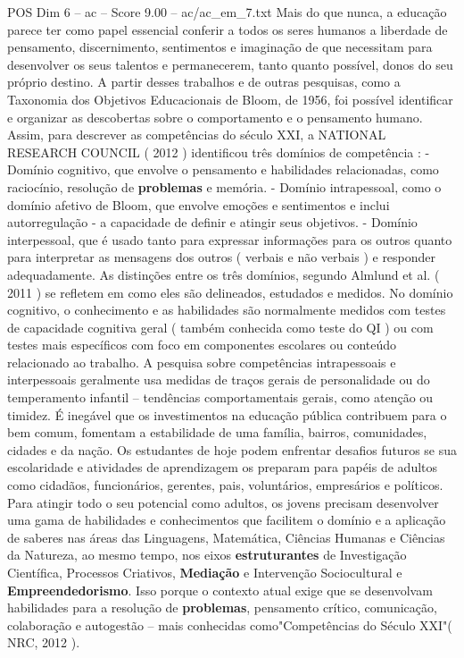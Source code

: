 \begin{textsample}{POS Dim 6 – ac – Score 9.00 – ac/ac\_em\_7.txt}
Mais do que nunca, a educação parece ter como papel essencial conferir a todos os seres humanos a liberdade de pensamento, discernimento, sentimentos e imaginação de que necessitam para desenvolver os seus talentos e permanecerem, tanto quanto possível, donos do seu próprio destino.
A partir desses trabalhos e de outras pesquisas, como a Taxonomia dos Objetivos Educacionais de Bloom, de 1956, foi possível identificar e organizar as descobertas sobre o comportamento e o pensamento humano.
Assim, para descrever as competências do século XXI, a NATIONAL RESEARCH COUNCIL ( 2012 ) identificou três domínios de competência : - Domínio cognitivo, que envolve o pensamento e habilidades relacionadas, como raciocínio, resolução de \textbf{problemas} e memória. - Domínio intrapessoal, como o domínio afetivo de Bloom, que envolve emoções e sentimentos e inclui autorregulação - a capacidade de definir e atingir seus objetivos. - Domínio interpessoal, que é usado tanto para expressar informações para os outros quanto para interpretar as mensagens dos outros ( verbais e não verbais ) e responder adequadamente.
As distinções entre os três domínios, segundo Almlund et al. ( 2011 ) se refletem em como eles são delineados, estudados e medidos.
No domínio cognitivo, o conhecimento e as habilidades são normalmente medidos com testes de capacidade cognitiva geral ( também conhecida como teste do QI ) ou com testes mais específicos com foco em componentes escolares ou conteúdo relacionado ao trabalho.
A pesquisa sobre competências intrapessoais e interpessoais geralmente usa medidas de traços gerais de personalidade ou do temperamento infantil – tendências comportamentais gerais, como atenção ou timidez.
É inegável que os investimentos na educação pública contribuem para o bem comum, fomentam a estabilidade de uma família, bairros, comunidades, cidades e da nação.
Os estudantes de hoje podem enfrentar desafios futuros se sua escolaridade e atividades de aprendizagem os preparam para papéis de adultos como cidadãos, funcionários, gerentes, pais, voluntários, empresários e políticos.
Para atingir todo o seu potencial como adultos, os jovens precisam desenvolver uma gama de habilidades e conhecimentos que facilitem o domínio e a aplicação de saberes nas áreas das Linguagens, Matemática, Ciências Humanas e Ciências da Natureza, ao mesmo tempo, nos eixos \textbf{estruturantes} de Investigação Científica, Processos Criativos, \textbf{Mediação} e Intervenção Sociocultural e \textbf{Empreendedorismo}.
Isso porque o contexto atual exige que se desenvolvam habilidades para a resolução de \textbf{problemas}, pensamento crítico, comunicação, colaboração e autogestão – mais conhecidas como"Competências do Século XXI"( NRC, 2012 ).

\end{textsample}
